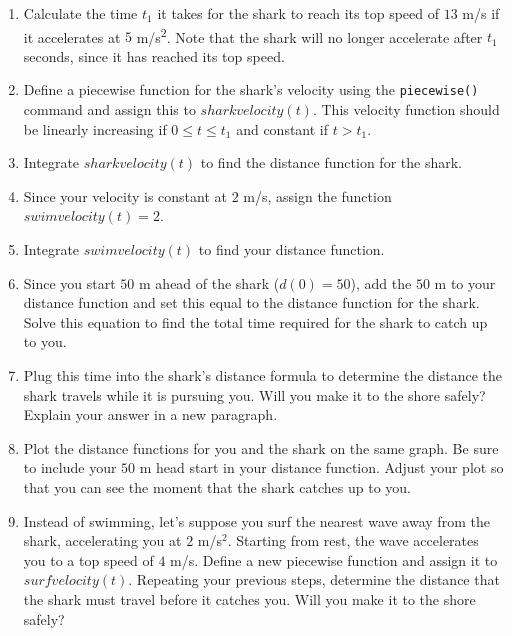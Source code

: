 \begin{enumerate}
    \item Calculate the time $t_1$ it takes for the shark to reach its top speed of $13$ m/s if it accelerates at $5$ m/s\textsuperscript{2}. Note that the shark will no longer accelerate after $t_1$ seconds, since it has reached its top speed. \label{ex:sharktime}
    \item Define a piecewise function for the shark's velocity using the \texttt{piecewise()} command and assign this to $sharkvelocity(t)$. This velocity function should be linearly increasing if $0 \leq t \leq t_1$ and constant if $t > t_1$.
    \item Integrate $sharkvelocity(t)$ to find the distance function for the shark.
    \item Since your velocity is constant at $2$ m/s, assign the function $swimvelocity(t) = 2$.
    \item Integrate $swimvelocity(t)$ to find your distance function. 
    \item Since you start $50$ m ahead of the shark ($d(0)=50$), add the $50$ m to your distance function and set this equal to the distance function for the shark. Solve this equation to find the total time required for the shark to catch up to you.
    \item Plug this time into the shark's distance formula to determine the distance the shark travels while it is pursuing you. Will you make it to the shore safely? Explain your answer in a new paragraph.
    \item Plot the distance functions for you and the shark on the same graph. Be sure to include your $50$ m head start in your distance function. Adjust your plot so that you can see the moment that the shark catches up to you.
    \item Instead of swimming, let's suppose you surf the nearest wave away from the shark, accelerating you at $2$ m/s$^2$. Starting from rest, the wave accelerates you to a top speed of $4$ m/s. Define a new piecewise function and assign it to $surfvelocity(t)$. Repeating your previous steps, determine the distance that the shark must travel before it catches you. Will you make it to the shore safely?
\end{enumerate}